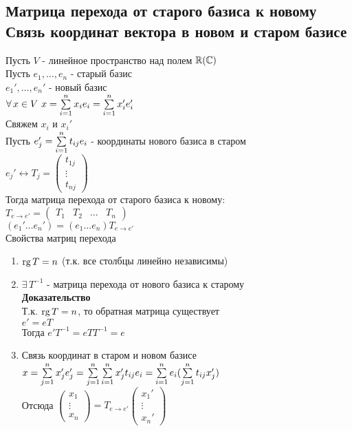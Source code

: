 \documentclass[12pt]{article}
\begin{document}
\subsection{Матрица перехода от старого базиса к новому\\Связь координат вектора в новом и старом базисе}
Пусть $V$ - линейное пространство над полем $\mathbb{R}(\mathbb{C})$\\
Пусть $e_1, \ldots, e_n$ - старый базис\\
$e_1',\ldots,e_n'$ - новый базис\\
$\forall\,x\in V\ x = \sum\limits_{i = 1}^n x_ie_i = \sum\limits_{i=1}^n x_i'e_i'$\\
Свяжем $x_i$ и $x_i'$\\
Пусть $e_j' = \sum\limits_{i=1}^n t_{ij} e_i$ - координаты нового базиса в старом\\
$e_j' \leftrightarrow T_j = \begin{pmatrix}
    t_{1j}\\
    \vdots\\
    t_{nj}
\end{pmatrix}$\\
Тогда матрица перехода от старого базиса к новому:\\
$T_{e \rightarrow e'} = \begin{pmatrix}
    T_1 & T_2 & \ldots & T_n
\end{pmatrix}$\\
$(e_1'\ldots e_n') = (e_1\ldots e_n) T_{e \rightarrow e'}$\\
Свойства матриц перехода
\begin{enumerate}
    \item $\operatorname{rg} T = n$ (т.к. все столбцы линейно независимы)
    \item $\exists\,T^{-1}$ - матрица перехода от нового базиса к старому\\
    \textbf{Доказательство}\\
    Т.к. $\operatorname{rg} T = n$, то обратная матрица существует\\
    $e' = eT$\\
    Тогда $e'T^{-1} = eTT^{-1} = e$\\
    \item Связь координат в старом и новом базисе\\
    $x = \sum\limits_{j=1}^n x_j'e_j' = \sum\limits_{j=1}^n\sum\limits_{i=1}^n x_j't_{ij}e_i = \sum\limits_{i=1}^n e_i(\sum\limits_{j=1}^n t_{ij}x_j')$\\
    Отсюда $\begin{pmatrix}x_1\\\vdots\\x_n\end{pmatrix} = T_{e\rightarrow e'}\begin{pmatrix}x_1'\\\vdots\\x_n'\end{pmatrix}$
\end{enumerate}
\end{document}
